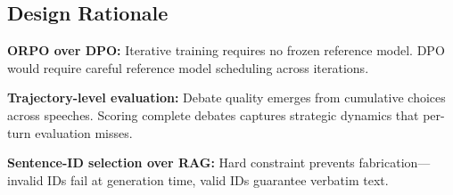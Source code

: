 \subsection{Design Rationale}

\textbf{ORPO over DPO:} Iterative training requires no frozen reference model. DPO would require careful reference model scheduling across iterations.

\textbf{Trajectory-level evaluation:} Debate quality emerges from cumulative choices across speeches. Scoring complete debates captures strategic dynamics that per-turn evaluation misses.

\textbf{Sentence-ID selection over RAG:} Hard constraint prevents fabrication---invalid IDs fail at generation time, valid IDs guarantee verbatim text.
